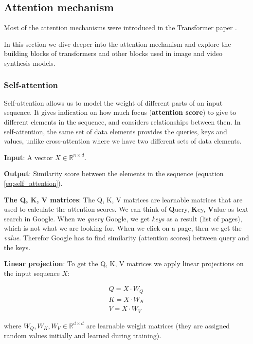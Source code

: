 \subsection{Attention mechanism}
\label{appendix:attention}

Most of the attention mechanisms were introduced in the Transformer paper \cite{transformer}.

In this section we dive deeper into the attention mechanism and explore the building blocks of transformers and other blocks used in image and video synthesis models.






\subsubsection{Self-attention}

Self-attention allows us to model the weight of different parts of an input sequence. It gives indication on how much focus (\textbf{attention score}) to give to different elements in the sequence, and considers relationships between then. In self-attention, the same set of data elements provides the queries, keys and values, unlike cross-attention where we have two different sets of data elements.

\textbf{Input}: A vector $X \in \mathbb{R}^{n \times d}$.

\textbf{Output}: Similarity score between the elements in the sequence (equation \ref{eq:self_attention}).

\textbf{The Q, K, V matrices}: The Q, K, V matrices are learnable matrices that are used to calculate the attention scores. We can think of \textbf{Q}uery, \textbf{K}ey, \textbf{V}alue as text search in Google. When we \textit{query} Google, we get \textit{keys} as a result (list of pages), which is not what we are looking for. When we click on a page, then we get the \textit{value}. Therefor Google has to find similarity (attention scores) between query and the keys.

\textbf{Linear projection}: To get the Q, K, V matrices we apply linear projections on the input sequence $X$: 

\begin{align*}
    Q = X\cdot W_Q \\
    K = X\cdot W_K \\
    V = X\cdot W_V
\end{align*}

where $W_Q, W_K, W_V \in \mathbb{R}^{d \times d}$ are learnable weight matrices (they are assigned random values initially and learned during training).



